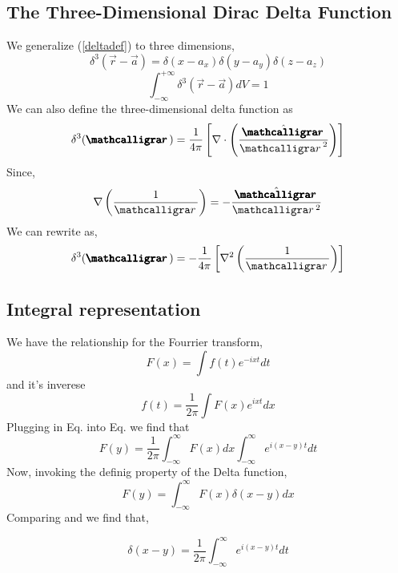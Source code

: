 \subsection{The Three-Dimensional Dirac Delta Function}
We generalize (\ref{deltadef}) to three dimensions,
\begin{equation}
\delta^{3}(\vec{r} - \vec{a}) = \delta(x-a_{x})\delta(y-a_{y})\delta(z-a_{z})
\end{equation}
\begin{equation}
\int_{- \infty}^{+ \infty} \delta^{3}(\vec{r} - \vec{a}) dV = 1
\end{equation}
We can also define the three-dimensional delta function as
\begin{equation}
\delta^{3}(\boldscriptr) = \frac{1}{4 \pi} \left[\nabla \cdot \left( \frac{\hat{\boldscriptr}}{{\scriptr	}^{2}}\right)\right]
\end{equation}
Since,
$$\nabla \left(\frac{1}{\scriptr}\right) = -\frac{\hat{\boldscriptr}}{\scriptr^{2}}$$
We can rewrite as,
\begin{equation}
\delta^{3}(\boldscriptr) = -\frac{1}{4 \pi} \left[\nabla^{2}  \left( \frac{1}{\scriptr}\right)\right]
\end{equation}
\subsection{Integral representation}
We have the relationship for the Fourrier transform,
\begin{equation}
F(x) = \int f(t) e^{-ixt} dt
\end{equation}
and it's inverese
\begin{equation}
f(t) = \frac{1}{2 \pi} \int F(x) e^{ixt} dx
\end{equation}
Plugging in Eq. into Eq. we find that 
\begin{equation}
	F(y) = \frac{1}{2 \pi} \int_{-\infty}^{\infty} F(x) dx \int_{-\infty}^{\infty}e^{i(x-y)t} dt
\end{equation}	
Now, invoking the definig property of the Delta function,
\begin{equation}
F(y) = \int_{-\infty}^{\infty} F(x) \delta(x-y) dx
\end{equation}
Comparing and we find that,
\begin{tcolorbox}
\begin{equation}
\delta(x-y) = \frac{1}{2 \pi} \int_{-\infty}^{\infty} e^{i(x-y)t} dt
\end{equation}
\end{tcolorbox}
